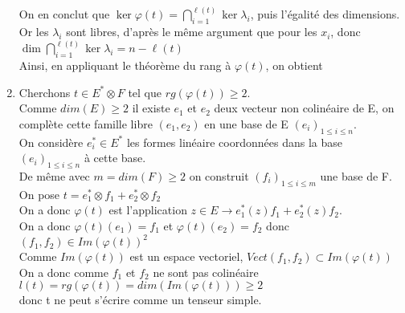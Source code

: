 \documentclass{article}
\DeclareMathOperator{\rg}{\mathrm{rg}}
\def \r {{\ell(t)}}
\begin{document}
\begin{enumerate}[1., start=1]
        \par \setlength{\leftskip}{0cm}
        On en conclut que $\displaystyle\ker \varphi(t) = \bigcap_{i=1}^\r\ker\lambda_i$, puis l'égalité des dimensions.\\
        Or les $\lambda_i$ sont libres, d'après le même argument que pour les $x_i$, donc $\displaystyle \dim\bigcap_{i=1}^\r\ker\lambda_i = n-\r$\\
        Ainsi, en appliquant le théorème du rang à $\varphi(t)$, on obtient
        \boxed{\rg\varphi(t) = \r}
    \item
    Cherchons $t\in E^* \otimes F$ tel que $rg(\varphi(t))\geq 2$. \\
    Comme $dim(E)\geq 2$ il existe $e_1$ et $e_2$ deux vecteur non colinéaire de E, on complète cette famille libre $(e_1,e_2)$ en une base de E $(e_i)_{1\leq i \leq n}$.  \\
    On considère $e^*_i \in E^*$ les formes linéaire coordonnées dans la base $(e_i)_{1 \leq i \leq n}$ à cette base. \\
    De même avec $m=dim(F) \geq 2$ on construit $(f_i)_{1\leq i \leq m}$ une base de F. \\
    On pose $t=e^*_1 \otimes f_1 + e^*_2 \otimes f_2$ \\
    On a donc $\varphi(t)$ est l'application $z \in E \rightarrow e^*_1(z) f_1 + e^*_2(z) f_2$. \\
    On a donc $\varphi(t)(e_1)=f_1$ et $\varphi(t)(e_2)=f_2$ donc $(f_1,f_2) \in Im(\varphi(t))^2$ \\
    Comme $Im(\varphi(t))$ est un espace vectoriel, $Vect(f_1,f_2) \subset Im(\varphi(t))$ \\
    On a donc comme $f_1$ et $f_2$ ne sont pas colinéaire $l(t)=rg(\varphi(t))=dim(Im(\varphi(t))) \geq 2$ \\
    donc t ne peut s'écrire comme un tenseur simple.

\end{enumerate}
\end{document}
